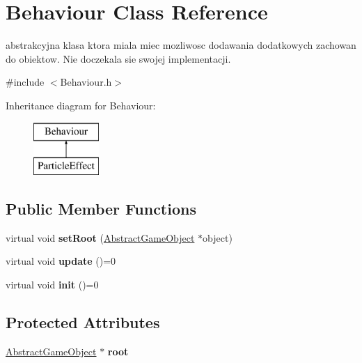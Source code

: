 \hypertarget{class_behaviour}{}\section{Behaviour Class Reference}
\label{class_behaviour}


abstrakcyjna klasa ktora miala miec mozliwosc dodawania dodatkowych zachowan do obiektow. Nie doczekala sie swojej implementacji.  




{\ttfamily \#include $<$Behaviour.\+h$>$}

Inheritance diagram for Behaviour\+:\begin{figure}[H]
\begin{center}
\leavevmode
\includegraphics[height=2.000000cm]{class_behaviour}
\end{center}
\end{figure}
\subsection*{Public Member Functions}
\begin{DoxyCompactItemize}
\item 
\mbox{\label{class_behaviour_ac7dfbc3199c2ebb1fd7d845ebb751117}} 
virtual void {\bfseries set\+Root} (\hyperlink{class_abstract_game_object}{Abstract\+Game\+Object} $\ast$object)
\item 
\mbox{\label{class_behaviour_ac88cef5429abdbc3809f8ee545613dcb}} 
virtual void {\bfseries update} ()=0
\item 
\mbox{\label{class_behaviour_a94724613d5c4651c8177d77c7808612c}} 
virtual void {\bfseries init} ()=0
\end{DoxyCompactItemize}
\subsection*{Protected Attributes}
\begin{DoxyCompactItemize}
\item 
\mbox{\label{class_behaviour_a302037bf6f38ca4b28e061cbdeb61b64}} 
\hyperlink{class_abstract_game_object}{Abstract\+Game\+Object} $\ast$ {\bfseries root}
\end{DoxyCompactItemize}


